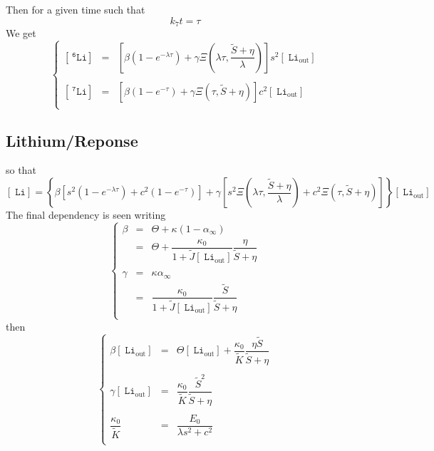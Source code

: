 \documentclass[aps,onecolumn,12pt]{revtex4}
\newcommand{\mychem}[1]{\mathtt{#1}}
\newcommand{\myconc}[1]{\left\lbrack{#1}\right\rbrack}
\newcommand{\spLi}[1]{{~^{\mychem{#1}}\mychem{Li}}}
\newcommand{\Li}[1]{\myconc{\spLi{#1}}}
\newcommand{\spLiOut}[1]{{\spLi{#1}}_{\mathrm{out}}}
\newcommand{\LiOut}[1]{\myconc{\spLiOut{#1}}}
\begin{document}
Then for a given time such that
\begin{equation}
	k_7 t = \tau
\end{equation}
We get
\begin{equation}
\left\lbrace
\begin{array}{rcl}
	\Li{6} & = & \left[ \beta\left(1-e^{-\lambda\tau}\right) + \gamma \Xi\left(\lambda\tau,\dfrac{\tilde{S}+\eta}{\lambda}\right) \right] s^2 \LiOut{} \\
	\\
	\Li{7} & = &  \left[ \beta\left(1-e^{-\tau}\right) + \gamma \Xi\left(\tau,\tilde{S}+\eta\right) \right] c^2 \LiOut{}\\
\end{array}
\right.
\end{equation}

\subsection{Lithium/Reponse}
so that
\begin{equation}
	\Li{} = \left\lbrace 
	\beta \left[ s^2 \left(1-e^{-\lambda\tau}\right) + c^2\left(1-e^{-\tau}\right) \right] 
	+ \gamma \left[  s^2 \Xi\left(\lambda\tau,{\dfrac{\tilde{S}+\eta}{\lambda}}\right) + c^2 \Xi\left(\tau,\tilde{S}+\eta\right) \right]
	\right \rbrace \LiOut{}
\end{equation}
The final dependency is seen writing
\begin{equation}
\left\lbrace
	\begin{array}{rcl}
	\beta & = &\Theta + \kappa\left(1-\alpha_\infty\right)\\
	      & = &\Theta + \dfrac{\kappa_0}{1+\tilde{J}\LiOut{}} \dfrac{\eta}{\tilde{S}+\eta}\\
	      \\
	\gamma & = & \kappa \alpha_\infty \\
	       & = & \dfrac{\kappa_0}{1+\tilde{J}\LiOut{}} \dfrac{\tilde{S}}{\tilde{S}+\eta} \\
	\end{array}
\right.
\end{equation}
then
\begin{equation}
\left\lbrace
	\begin{array}{rcl}
	\beta\LiOut{} & = & \Theta \LiOut{} + \dfrac{\kappa_0}{\tilde{K}} \dfrac{\eta\tilde{S}}{\tilde{S}+\eta}\\
	\\
	\gamma\LiOut{} & = & \dfrac{\kappa_0}{\tilde{K}} \dfrac{\tilde{S}^2}{\tilde{S}+\eta}\\
	\\
	\dfrac{\kappa_0}{\tilde{K}} & = & \dfrac{E_0}{\lambda s^2 + c^2}\\
	\end{array}
\right.
\end{equation}
\end{document}
